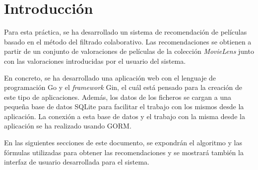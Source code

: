 \section{Introducción}

Para esta práctica, se ha desarrollado un sistema de recomendación de películas basado en el método del filtrado colaborativo. Las recomendaciones se obtienen a partir de un conjunto de valoraciones de películas de la colección \textit{MovieLens} junto con las valoraciones introducidas por el usuario del sistema.

En concreto, se ha desarrollado una aplicación web con el lenguaje de programación Go y el \textit{framework} Gin, el cuál está pensado para la creación de este tipo de aplicaciones. Además, los datos de los ficheros se cargan a una pequeña base de datos SQLite para facilitar el trabajo con los mismos desde la aplicación. La conexión a esta base de datos y el trabajo con la misma desde la aplicación se ha realizado usando GORM.

En las siguientes secciones de este documento, se expondrán el algoritmo y las fórmulas utilizadas para obtener las recomendaciones y se mostrará también la interfaz de usuario desarrollada para el sistema.